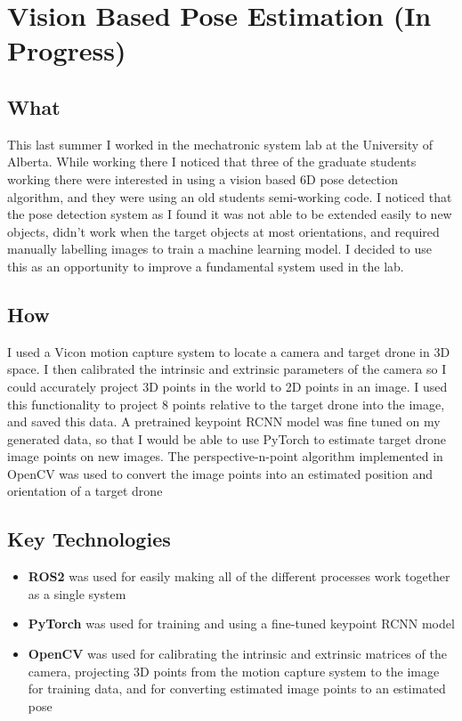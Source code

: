 \documentclass[11pt]{article}
\begin{document}
\section*{Vision Based Pose Estimation \small (In Progress)}
\subsection*{What}
This last summer I worked in the mechatronic system lab at the University of Alberta. While working there I noticed that three of the graduate students working there were interested in using a vision based 6D pose detection algorithm, and they were using an old students semi-working code. I noticed that the pose detection system as I found it was not able to be extended easily to new objects, didn't work when the target objects at most orientations, and required manually labelling images to train a machine learning model. I decided to use this as an opportunity to improve a fundamental system used in the lab. 
\subsection*{How}
I used a Vicon motion capture system to locate a camera and target drone in 3D space. I then calibrated the intrinsic and extrinsic parameters of the camera so I could accurately project 3D points in the world to 2D points in an image. I used this functionality to project 8 points relative to the target drone into the image, and saved this data. A pretrained keypoint RCNN model was fine tuned on my generated data, so that I would be able to use PyTorch to estimate target drone image points on new images. The perspective-n-point algorithm implemented in OpenCV was used to convert the image points into an estimated position and orientation of a target drone
\subsection*{Key Technologies}
\begin{itemize}
    \item \textbf{ROS2} was used for easily making all of the different processes work together as a single system
    \item \textbf{PyTorch} was used for training and using a fine-tuned keypoint RCNN model
    \item \textbf{OpenCV} was used for calibrating the intrinsic and extrinsic matrices of the camera, projecting 3D points from the motion capture system to the image for training data, and for converting estimated image points to an estimated pose
\end{itemize}
\end{document}
